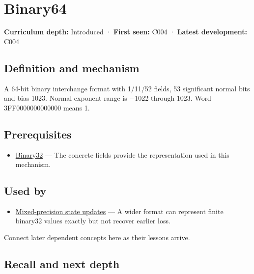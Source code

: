\hypertarget{appendix-5078dfab64e6}{}\label{referencestart:appendix-5078dfab64e6}
\section{Binary64}\label{appendix-5078dfab64e6-binary64}

\textbf{Curriculum depth:} Introduced · \textbf{First seen:} C004 · \textbf{Latest development:} C004

\subsection{Definition and mechanism}\label{appendix-5078dfab64e6-definition-and-mechanism}

A 64-bit binary interchange format with 1/11/52 fields, 53 significant normal bits and bias 1023. Normal exponent range is −1022 through 1023. Word 3FF0000000000000 means 1.

\subsection{Prerequisites}\label{appendix-5078dfab64e6-prerequisites}

\begin{itemize}
\tightlist
\item
  \hyperref[appendix-5057f9ad327f]{Binary32} --- The concrete fields provide the representation used in this mechanism.
\end{itemize}

\subsection{Used by}\label{appendix-5078dfab64e6-used-by}

\begin{itemize}
\tightlist
\item
  \hyperref[appendix-260182e617b7]{Mixed-precision state updates} --- A wider format can represent finite binary32 values exactly but not recover earlier loss.
\end{itemize}

Connect later dependent concepts here as their lessons arrive.

\subsection{Recall and next depth}\label{appendix-5078dfab64e6-recall-and-next-depth}

